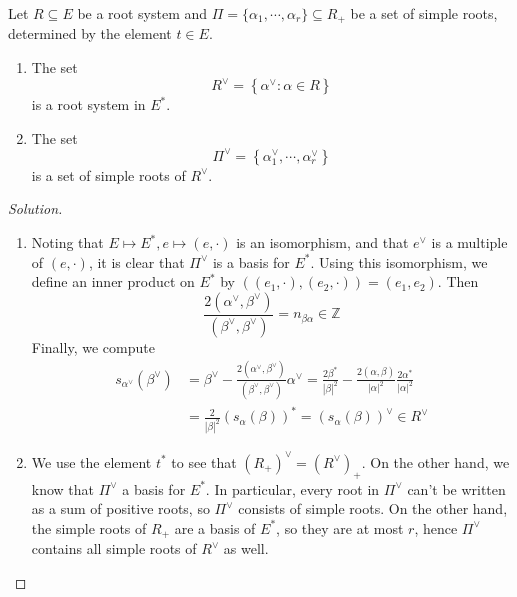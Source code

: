 \documentclass{report}
\begin{document}
\begin{exercise}[Exercise 7.2]
    Let $R \subseteq E$ be a root system and $\Pi = \{\alpha_1, \cdots, \alpha_r\} \subseteq R_+$ be a set of simple roots, determined by the element $t \in E$.
    \begin{enumerate}[label = (\roman*)]
        \item The set
        \[
        R^\vee = \left\{ \alpha^\vee : \alpha \in R \right\}
        \]
        is a root system in $E^*$.
        \item The set 
        \[
        \Pi^\vee = \left\{ \alpha_1^\vee, \cdots, \alpha_r^\vee \right\}
        \]
        is a set of simple roots of $R^\vee$.
    \end{enumerate}
\end{exercise}
\begin{proof}[Solution]
    \begin{enumerate}[label = (\roman*)]
        \item Noting that $E \mapsto E^*, e \mapsto (e, \cdot)$ is an isomorphism, and that $e^\vee$ is a multiple of $(e, \cdot)$, it is clear that $\Pi^\vee$ is a basis for $E^*$.
        Using this isomorphism, we define an inner product on $E^*$ by $\left((e_1, \cdot), (e_2, \cdot)\right) = (e_1, e_2)$.
        Then
        \[
        \frac{2(\alpha^\vee, \beta^\vee)}{(\beta^\vee, \beta^\vee)} = n_{\beta \alpha} \in \mathbb Z
        \]  
        Finally, we compute
        \begin{align*}
            s_{\alpha^\vee}(\beta^\vee) &= \beta^\vee - \frac{2(\alpha^\vee, \beta^\vee)}{(\beta^\vee, \beta^\vee)} \alpha^\vee =
            \frac{2\beta^*}{|\beta|^2} - \frac{2(\alpha, \beta)}{|\alpha|^2} \frac{2\alpha^*}{|\alpha|^2}\\
            &= \frac{2}{|\beta|^2} \left(s_\alpha(\beta)\right)^* = \left(s_\alpha(\beta)\right)^\vee \in R^\vee
        \end{align*}
        \item We use the element $t^*$ to see that $(R_+)^\vee = (R^\vee)_+$.
        On the other hand, we know that $\Pi^\vee$ a basis for $E^*$.
        In particular, every root in $\Pi^\vee$ can't be written as a sum of positive roots, so $\Pi^\vee$ consists of simple roots.
        On the other hand, the simple roots of $R_+$ are a basis of $E^*$, so they are at most $r$, hence $\Pi^\vee$ contains all simple roots of $R^\vee$ as well.
    \end{enumerate}
\end{proof}
\end{document}
